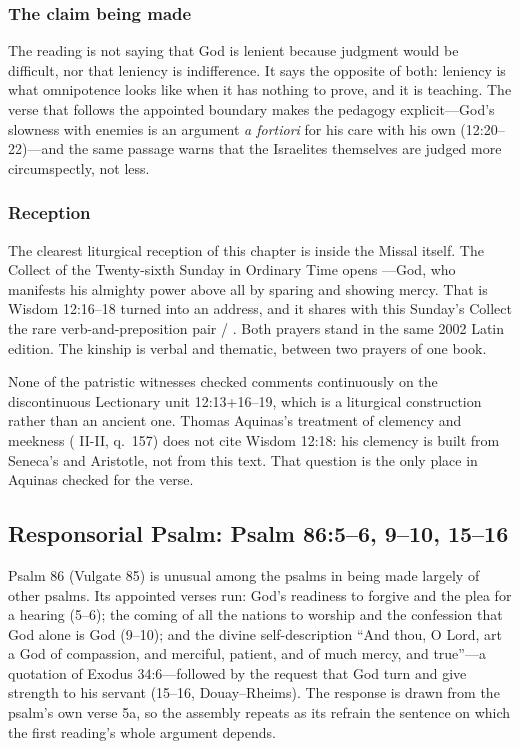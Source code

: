 \subsubsection*{The claim being made}

The reading is not saying that God is lenient because judgment would be
difficult, nor that leniency is indifference. It says the opposite of both:
leniency is what omnipotence looks like when it has nothing to prove, and it is
teaching. The verse that follows the appointed boundary makes the pedagogy
explicit---God's slowness with enemies is an argument \emph{a fortiori} for his
care with his own (12:20--22)---and the same passage warns that the Israelites
themselves are judged more circumspectly, not less.

\subsubsection*{Reception}

The clearest liturgical reception of this chapter is inside the Missal itself.
The Collect of the Twenty-sixth Sunday in Ordinary Time opens ---God, who manifests his almighty power above all by
sparing and showing mercy. That is Wisdom 12:16--18 turned into an address,
and it shares with this Sunday's Collect the rare verb-and-preposition pair
 / . Both
prayers stand in the same 2002 Latin edition. The kinship is verbal and
thematic, between two prayers of one book.

None of the patristic witnesses checked comments continuously on the
discontinuous Lectionary unit 12:13+16--19, which is a liturgical construction
rather than an ancient one. Thomas Aquinas's treatment of clemency and
meekness ( II-II, q.\ 157) does not cite Wisdom 12:18:
his clemency is built from Seneca's  and Aristotle, not
from this text. That question is the only place in Aquinas checked for the
verse.

\subsection*{Responsorial Psalm: Psalm 86:5--6, 9--10, 15--16}

Psalm 86 (Vulgate 85) is unusual among the psalms in being made largely of
other psalms. Its appointed verses run: God's readiness to forgive and the
plea for a hearing (5--6); the coming of all the nations to worship and the
confession that God alone is God (9--10); and the divine self-description
``And thou, O Lord, art a God of compassion, and merciful, patient, and of much
mercy, and true''---a quotation of Exodus 34:6---followed by the request that
God turn and give strength to his servant (15--16, Douay--Rheims). The response
is drawn from the psalm's own verse 5a, so the assembly repeats as its refrain
the sentence on which the first reading's whole argument depends.

